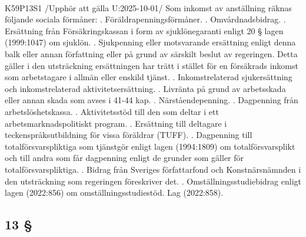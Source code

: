 \documentclass[a4paper,notitlepage,openany,10pt]{book}
\begin{document}
\paragraph*{}
{\tiny K59P13S1}
/Upphör att gälla U:2025-10-01/
Som inkomst av anställning räknas följande sociala förmåner:
. Föräldrapenningsförmåner.
. Omvårdnadsbidrag.
. Ersättning från Försäkringskassan i form av sjuklönegaranti enligt 20 § lagen (1999:1047) om sjuklön.
. Sjukpenning eller motsvarande ersättning enligt denna balk eller annan författning eller på grund av särskilt beslut av regeringen. Detta gäller i den utsträckning ersättningen har trätt i stället för en försäkrads inkomst som arbetstagare i allmän eller enskild tjänst.
. Inkomstrelaterad sjukersättning och inkomstrelaterad aktivitetsersättning.
. Livränta på grund av arbetsskada eller annan skada som avses i 41-44 kap.
. Närståendepenning.
. Dagpenning från arbetslöshetskassa.
. Aktivitetsstöd till den som deltar i ett arbetsmarknadspolitiskt program.
. Ersättning till deltagare i teckenspråksutbildning för vissa föräldrar (TUFF).
. Dagpenning till totalförsvarspliktiga som tjänstgör enligt lagen (1994:1809) om totalförsvarsplikt och till andra som får dagpenning enligt de grunder som gäller för totalförsvarspliktiga.
. Bidrag från Sveriges författarfond och Konstnärsnämnden i den utsträckning som regeringen föreskriver det.
. Omställningsstudiebidrag enligt lagen (2022:856) om omställningsstudiestöd.
Lag (2022:858).
\subsection*{13 §}
\end{document}
